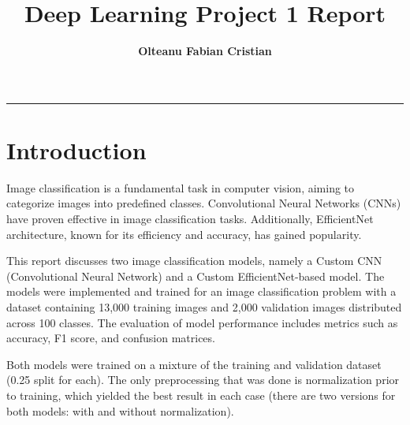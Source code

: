 \documentclass{article}
\author{\textbf{Olteanu Fabian Cristian}}
\affil{FMI, AI Master, Year 2
}
\title{\textbf{\huge Deep Learning Project 1 Report}}
\date{}
\begin{document}
\pagestyle{headings}	
\newpage
\setcounter{page}{1}
\renewcommand{\thepage}{\arabic{page}}


	
	
\setlength{\parskip}{0.5em}
	
\maketitle
	
\noindent\rule{15cm}{0.4pt}

\section{Introduction}
Image classification is a fundamental task in computer vision, aiming to categorize images into predefined classes. Convolutional Neural Networks (CNNs) have proven effective in image classification tasks. Additionally, EfficientNet\cite{effinet} architecture, known for its efficiency and accuracy, has gained popularity.

This report discusses two image classification models, namely a Custom CNN (Convolutional Neural Network) and a Custom EfficientNet-based model. The models were implemented and trained for an image classification problem with a dataset containing 13,000 training images and 2,000 validation images distributed across 100 classes. The evaluation of model performance includes metrics such as accuracy, F1 score, and confusion matrices.

Both models were trained on a mixture of the training and validation dataset (0.25 split for each). The only preprocessing that was done is normalization prior to training, which yielded the best result in each case (there are two versions for both models: with and without normalization).
\end{document}
